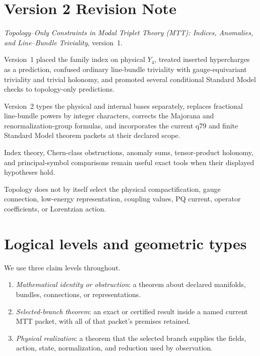 \documentclass[11pt]{article}
\theoremstyle{plain}
\theoremstyle{definition}
\theoremstyle{remark}
\begin{document}
\section*{Version 2 Revision Note}
\begin{description}[style=nextline]
\item[Supersedes]
\emph{Topology--Only Constraints in Modal Triplet Theory (MTT): Indices,
Anomalies, and Line--Bundle Triviality}, version~1.
\item[Reason]
Version~1 placed the family index on physical $Y_4$, treated inserted
hypercharges as a prediction, confused ordinary line-bundle triviality with
gauge-equivariant triviality and trivial holonomy, and promoted several
conditional Standard Model checks to topology-only predictions.
\item[Resolution]
Version~2 types the physical and internal bases separately, replaces fractional
line-bundle powers by integer characters, corrects the Majorana and
renormalization-group formulas, and incorporates the current q79 and finite
Standard Model theorem packets at their declared scope.
\item[Retained result]
Index theory, Chern-class obstructions, anomaly sums, tensor-product holonomy,
and principal-symbol comparisons remain useful exact tools when their displayed
hypotheses hold.
\item[Remaining boundary]
Topology does not by itself select the physical compactification, gauge
connection, low-energy representation, coupling values, PQ current, operator
coefficients, or Lorentzian action.
\end{description}

\section{Logical levels and geometric types}

We use three claim levels throughout.

\begin{enumerate}[label=\textbf{L\arabic*.},leftmargin=*]
\item \emph{Mathematical identity or obstruction}: a theorem about declared
manifolds, bundles, connections, or representations.
\item \emph{Selected-branch theorem}: an exact or certified result inside a
named current MTT packet, with all of that packet's premises retained.
\item \emph{Physical realization}: a theorem that the selected branch supplies
the fields, action, state, normalization, and reduction used by observation.
\end{enumerate}
\end{document}
